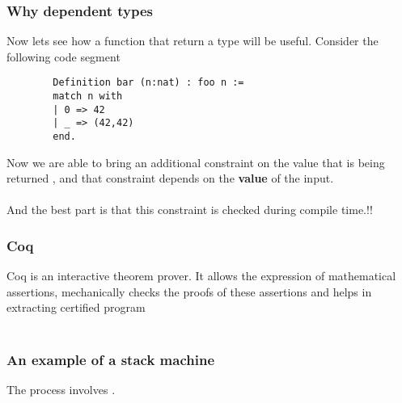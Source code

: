 \documentclass{beamer}
\begin{document}
\begin{frame}[fragile]
    \frametitle{Why dependent types}
    Now lets see how a function that return a type will be useful. Consider the following code segment
    \begin{verbatim}
        Definition bar (n:nat) : foo n :=
        match n with
        | 0 => 42
        | _ => (42,42)
        end.
    \end{verbatim}
    Now we are able to bring an additional constraint on the value  that is being returned , and that 
    constraint depends on the \textbf{value} of the input. \\~\\
    And the best part is that this constraint is checked during compile time.!!
    
\end{frame}

\begin{frame}
    \frametitle{Coq}
        Coq is an interactive theorem prover. It allows the expression of mathematical assertions,
        mechanically checks the proofs of these assertions and helps in extracting certified program 
        \\~\\
        \begin{itemize}
        \end{itemize}
    

\end{frame}

\begin{frame}[fragile]
    \frametitle{An example of a stack machine}
    The process involves . 
    \begin{itemize}
    \end{itemize}
\end{frame}
\end{document}
